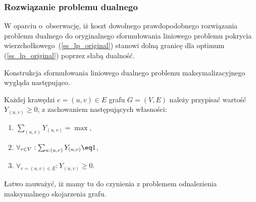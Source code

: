 \subsubsection{\textbf{Rozwiązanie problemu dualnego}}

W oparciu o~obserwację, iż koszt dowolnego prawdopodobnego rozwiązania problemu
dualnego do oryginalnego sformułowania liniowego problemu pokrycia
wierzchołkowego~(\ref{ss_lp_original}) stanowi dolną granicę dla optimum
(\ref{ss_lp_original}) poprzez słabą dualność. 

Konstrukcja sformułowania liniowego dualnego problemu maksymalizacyjnego wygląda
następująco.

Każdej krawędzi $e=(u,v) \in E$ grafu $G=(V,E)$ należy przypisać wartość
$Y_(u,v) \geq 0$, z zachowaniem następujących własności:
\begin{enumerate}
  \item $\sum_{(u,v)}Y_{(u,v)} = \max$,
  \item $\forall_{v \in V}:\sum_{u:(u,v)}Y_{(u,v)}\eq 1$,
  \item $\forall_{e=(u,v) \in E}: Y_{(u,v)} \geq 0$.
\end{enumerate}

Łatwo zauważyć, iż mamy tu do czynienia z problemem odnalezienia maksymalnego
skojarzenia grafu.